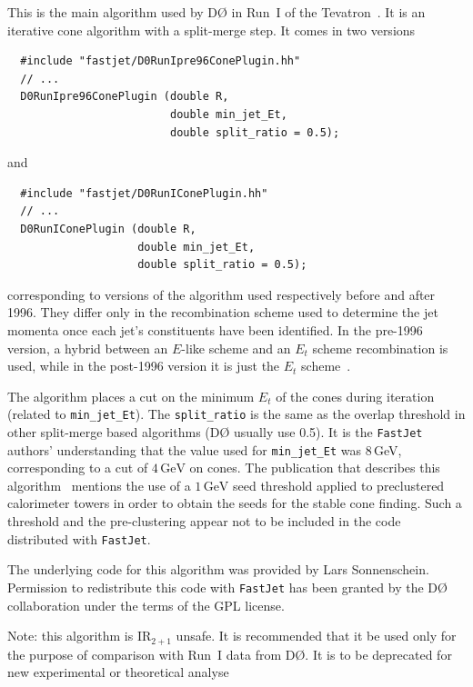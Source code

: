 \documentclass[12pt,a4]{article}
\newcommand{\fastjet}{\texttt{FastJet}\xspace}
\newcommand{\Dzero}{D\O\xspace}
\newcommand{\GeV}{\,\text{GeV}}
\begin{document}
This is the main algorithm used by \Dzero in Run~I of the
Tevatron~\cite{Abbott:1997fc}. It is an iterative cone algorithm
with a split-merge step. It comes in two versions
\begin{lstlisting}
  #include "fastjet/D0RunIpre96ConePlugin.hh"
  // ...
  D0RunIpre96ConePlugin (double R, 
                         double min_jet_Et, 
                         double split_ratio = 0.5);
\end{lstlisting}
and
\begin{lstlisting}
  #include "fastjet/D0RunIConePlugin.hh"
  // ...
  D0RunIConePlugin (double R, 
                    double min_jet_Et, 
                    double split_ratio = 0.5);
\end{lstlisting}
corresponding to versions of the algorithm used respectively before
and after 1996.
%
They differ only in the recombination scheme used to determine the jet
momenta once each jet's constituents have been identified.
%
In the pre-1996 version, a hybrid between an $E$-like scheme and an
$E_t$ scheme recombination is used, while in the post-1996 version it
is just the $E_t$ scheme~\cite{Abbott:1997fc}.

The algorithm places a cut on the minimum $E_t$ of the cones during
iteration (related to \verb|min_jet_Et|).
%
The \verb|split_ratio| is the same as the overlap threshold in other
split-merge based algorithms (\Dzero usually use 0.5).
%
It is the \fastjet authors' understanding that the value 
used for \verb|min_jet_Et| was 8\,GeV, corresponding to a cut of
$4\GeV$ on cones.
%
The publication that describes this algorithm~\cite{Abbott:1997fc}
mentions the use of a $1\GeV$ seed threshold applied to preclustered
calorimeter towers in order to obtain the seeds for the stable cone
finding. 
%
Such a threshold and the pre-clustering appear not to be included in the code
distributed with \fastjet.

The underlying code for this algorithm was provided by
Lars Sonnenschein.
%
Permission to redistribute this code with \fastjet has been granted by
the \Dzero collaboration under the terms of the GPL license.



Note: this algorithm is IR$_{2+1}$ unsafe. It is recommended that it
be used only for the purpose of comparison with Run~I data from
\Dzero.
%
It is to be deprecated for new experimental or theoretical analyse

\end{document}
